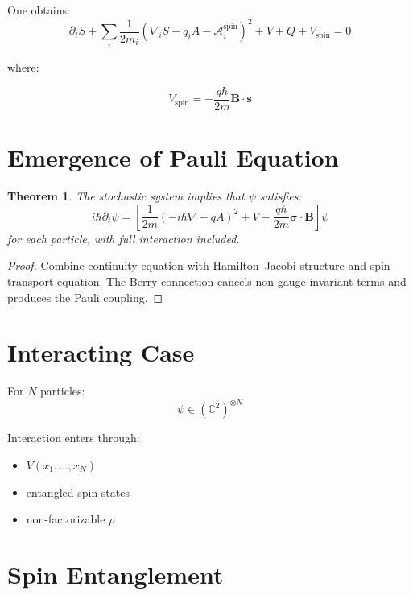\documentclass[11pt]{article}
\newtheorem{theorem}{Theorem}
\begin{document}
One obtains:
\begin{equation}
\partial_t S + \sum_i \frac{1}{2m_i}
\left( \nabla_i S - q_i A - \mathcal{A}_i^{\text{spin}} \right)^2
+ V + Q + V_{\text{spin}} = 0
\end{equation}

where:

\begin{equation}
V_{\text{spin}} = -\frac{q\hbar}{2m} \mathbf{B}\cdot \mathbf{s}
\end{equation}

\section{Emergence of Pauli Equation}

\begin{theorem}
The stochastic system implies that $\psi$ satisfies:
\begin{equation}
i\hbar \partial_t \psi =
\left[
\frac{1}{2m}(-i\hbar\nabla - qA)^2
+ V
- \frac{q\hbar}{2m} \bm{\sigma}\cdot \mathbf{B}
\right]\psi
\end{equation}
for each particle, with full interaction included.
\end{theorem}

\begin{proof}
Combine continuity equation with Hamilton--Jacobi structure and spin transport equation. The Berry connection cancels non-gauge-invariant terms and produces the Pauli coupling.
\end{proof}

\section{Interacting Case}

For $N$ particles:
\begin{equation}
\psi \in (\mathbb{C}^2)^{\otimes N}
\end{equation}

Interaction enters through:
\begin{itemize}
\item $V(x_1,\dots,x_N)$
\item entangled spin states
\item non-factorizable $\rho$
\end{itemize}

\section{Spin Entanglement}
\end{document}
